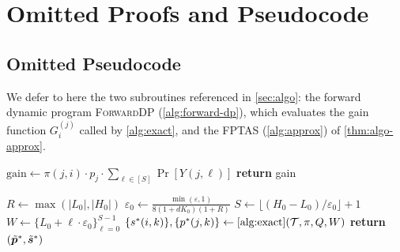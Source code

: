 \newpage
\section{Omitted Proofs and Pseudocode}
\label{sec:omitted-proofs}

\subsection{Omitted Pseudocode}
We defer to here the two subroutines referenced in \cref{sec:algo}: the forward dynamic program \textsc{ForwardDP} (\cref{alg:forward-dp}), which evaluates the gain function $G^{(j)}_i$ called by \cref{alg:exact}, and the FPTAS (\cref{alg:approx}) of \cref{thm:algo-approx}.

\begin{algorithm}[H]
\caption{ForwardDP: Compute $G^{(j)}_i(w_k, p_j)$}
\label{alg:forward-dp}
$\text{gain} \gets \pi(j, i) \cdot p_j \cdot \sum_{\ell \in [S]} \Pr[Y(j, \ell)]$\;
\textbf{return} gain\;
\end{algorithm}

\begin{algorithm}[H]
\caption{FPTAS for $\varepsilon$-Approximate Equilibrium}
\label{alg:approx}
$R \gets \max(|L_0|, |H_0|)$\;
$\varepsilon_0 \gets \frac{\min(\varepsilon, 1)}{8(1 + dK_0)(1 + R)}$\;
$S \gets \lfloor (H_0 - L_0)/\varepsilon_0 \rfloor + 1$\;
$W \gets \{L_0 + \ell \cdot \varepsilon_0\}_{\ell = 0}^{S-1}$\;
$\{s^*(i,k)\}, \{p^*(j,k)\} \gets \text{\cref{alg:exact}}(\calT, \pi, Q, W)$\;
\textbf{return} $(\tilde{{\bm{p}}}^*, \tilde{{\bm{s}}}^*)$\;
\end{algorithm}


